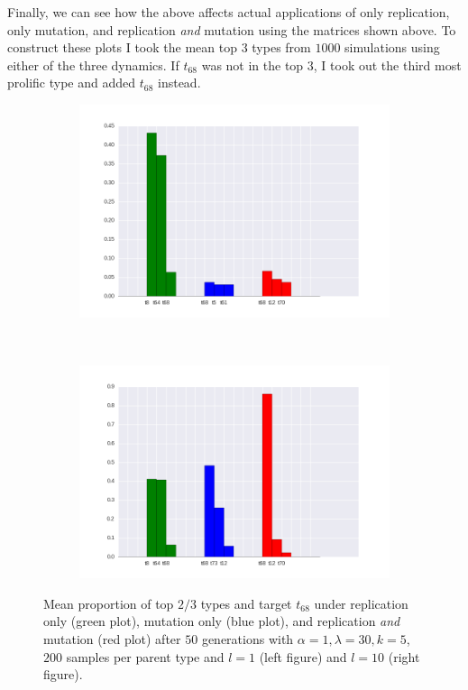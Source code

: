 \documentclass[a4paper]{article}
\begin{document}
\newpage

Finally, we can see how the above affects actual applications of only replication, only mutation, and replication \emph{and} mutation using the matrices shown above. To construct these plots I took the mean top $3$ types from $1000$ simulations using either of the three dynamics. If $t_{68}$ was not in the top $3$, I took out the third most prolific type and added $t_{68}$ instead. 

\begin{figure}[h!]
  \centering
  \begin{subfigure}[b]{0.45\textwidth}
    \includegraphics[scale=0.4]{../code-LOT-extension/plots/rmd-lam30-a1-k5-s200-l1-meFalse.png}
  \end{subfigure}
  ~
   \begin{subfigure}[b]{0.45\textwidth}
    \includegraphics[scale=0.4]{../code-LOT-extension/plots/rmd-lam30-a1-k5-s200-l10-meFalse.png}
  \end{subfigure}
  \caption{Mean proportion of top $2/3$ types and target $t_{68}$ under replication only (green plot), mutation only (blue plot), and replication {\em and} mutation (red plot) after $50$ generations with $\alpha = 1, \lambda = 30, k = 5$, $200$ samples per parent type and $l = 1$ (left figure) and $l = 10$ (right figure).}
  \label{fig:outcomes}
\end{figure}









\end{document}

